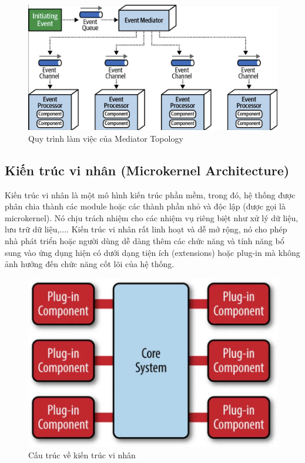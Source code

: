 \begin{figure}[htp!]

	\centering
    \includegraphics[scale=0.3]{img/Mediator_Topology.png}
    \caption{Quy trình làm việc của Mediator Topology}
\end{figure}


\subsection{Kiến trúc vi nhân (Microkernel Architecture)}


Kiến trúc vi nhân là một mô hình kiến trúc phần mềm, trong đó, hệ thống được phân chia thành các module hoặc các thành phần nhỏ và độc lập (được gọi là microkernel). Nó chịu trách nhiệm cho các nhiệm vụ riêng biệt như xử lý dữ liệu, lưu trữ dữ liệu,.... Kiến trúc vi nhân rất linh hoạt và dễ mở rộng, nó cho phép nhà phát triển hoặc người dùng dễ dàng thêm các chức năng và tính năng bổ sung vào ứng dụng hiện có dưới dạng tiện ích (extensions) hoặc plug-in mà không ảnh hưởng đến chức năng cốt lõi của hệ thống.


\begin{figure}[H]

	\centering
    \includegraphics[scale=0.4]{img/microkernel_architecture.png}
    \caption{Cấu trúc về kiến trúc vi nhân}
\end{figure}
\newpage

